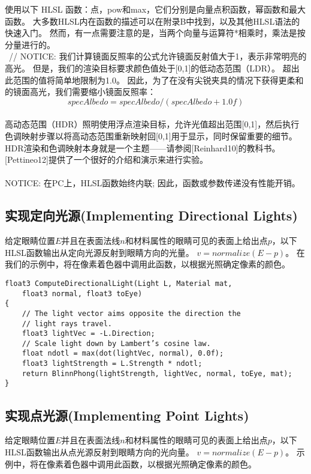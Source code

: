 \begin{flushleft}
使用以下 HLSL 函数：点，pow和max，它们分别是向量点积函数，幂函数和最大函数。 大多数HLSL内在函数的描述可以在附录B中找到，以及其他HLSL语法的快速入门。 然而，有一点需要注意的是，当两个向量与运算符*相乘时，乘法是按分量进行的。\\
~//
NOTICE: 我们计算镜面反照率的公式允许镜面反射值大于1，表示非常明亮的高光。 但是，我们的渲染目标要求颜色值处于[0,1]的低动态范围（LDR）。 超出此范围的值将简单地限制为1.0。 因此，为了在没有尖锐夹具的情况下获得更柔和的镜面高光，我们需要缩小镜面反照率：\\
$$specAlbedo = specAlbedo / (specAlbedo + 1.0f)$$\\
高动态范围（HDR）照明使用浮点渲染目标，允许光值超出范围[0,1]，然后执行色调映射步骤以将高动态范围重新映射回[0,1]用于显示，同时保留重要的细节。 HDR渲染和色调映射本身就是一个主题——请参阅[Reinhard10]的教科书。[Pettineo12]提供了一个很好的介绍和演示来进行实验。\\

~\\
NOTICE: 在PC上，HLSL函数始终内联; 因此，函数或参数传递没有性能开销。
\end{flushleft}

\subsection{实现定向光源(Implementing Directional Lights)}
\begin{flushleft}
给定眼睛位置$E$并且在表面法线$n$和材料属性的眼睛可见的表面上给出点$p$，以下HLSL函数输出从定向光源反射到眼睛方向的光量。 $v=normalize(E - p)$。 在我们的示例中，将在像素着色器中调用此函数，以根据光照确定像素的颜色。\\
\end{flushleft}

\begin{lstlisting}
float3 ComputeDirectionalLight(Light L, Material mat,
    float3 normal, float3 toEye)
{
    // The light vector aims opposite the direction the 
    // light rays travel.
    float3 lightVec = -L.Direction;
    // Scale light down by Lambert’s cosine law.
    float ndotl = max(dot(lightVec, normal), 0.0f);
    float3 lightStrength = L.Strength * ndotl;
    return BlinnPhong(lightStrength, lightVec, normal, toEye, mat);
}
\end{lstlisting}

\subsection{实现点光源(Implementing Point Lights)}
\begin{flushleft}
给定眼睛位置$E$并且在表面法线$n$和材料属性的眼睛可见的表面上给出点$p$，以下HLSL函数输出从点光源反射到眼睛方向的光向量。 $v =normalize(E-p)$。 示例中，将在像素着色器中调用此函数，以根据光照确定像素的颜色。\\
\end{flushleft}

